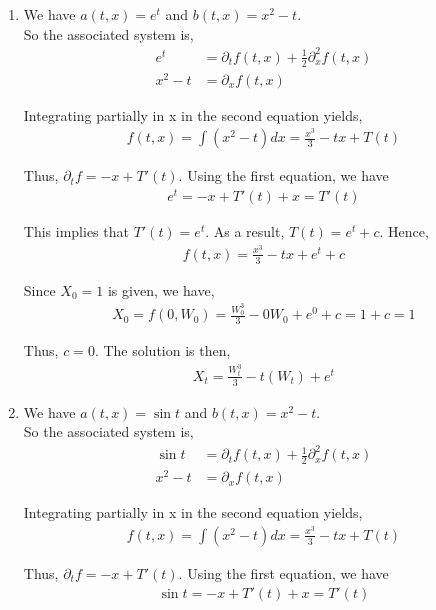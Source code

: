 \documentclass[12pt]{article}
\begin{document}
\begin{enumerate}[\alph*)]

\item We have $a(t,x) = e^t$ and $b(t,x) = x^2 - t$.\\

So the associated system is,
\begin{align*}
e^t &= \partial_t f(t,x) + \frac{1}{2} \partial_x^2 f(t,x)\\
x^2 - t &= \partial_x f(t,x)
\end{align*}

Integrating partially in x in the second equation yields,
\begin{align*}
f(t,x) = \int (x^2 - t) dx = \frac{x^3}{3} - tx + T(t)
\end{align*}

Thus, $\partial_t f = -x + T'(t)$. Using the first equation, we have
\begin{align*}
e^t = -x + T'(t) + x = T'(t)
\end{align*}

This implies that $T'(t) = e^t$. As a result, $T(t) = e^t + c$. Hence,
\begin{align*}
f(t,x) = \frac{x^3}{3} - tx + e^t + c
\end{align*}

Since $X_0 = 1$ is given, we have,
\begin{align*}
X_0 = f(0, W_0) = \frac{W_0^3}{3} - 0W_0 + e^0 + c = 1 + c = 1
\end{align*}

Thus, $c = 0$. The solution is then,
\begin{align*}
X_t = \frac{W_t^3}{3} - t(W_t) + e^t
\end{align*}

\item We have $a(t,x) = \sin t$ and $b(t,x) = x^2 - t$.\\

So the associated system is,
\begin{align*}
\sin t &= \partial_t f(t,x) + \frac{1}{2} \partial_x^2 f(t,x)\\
x^2 - t &= \partial_x f(t,x)
\end{align*}

Integrating partially in x in the second equation yields,
\begin{align*}
f(t,x) = \int (x^2 - t) dx = \frac{x^3}{3} - tx + T(t)
\end{align*}

Thus, $\partial_t f = -x + T'(t)$. Using the first equation, we have
\begin{align*}
\sin t = -x + T'(t) + x = T'(t)
\end{align*}


\end{enumerate}
\end{document}
